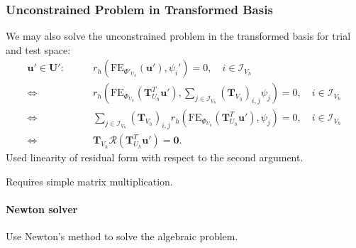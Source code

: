 \begin{frame}
\frametitle<presentation>{Unconstrained Problem in Transformed Basis}
We may also solve the unconstrained problem 
in the transformed basis for trial and test space:
\begin{equation}\label{Eq:TransformedUnconstrainedProblem}
\begin{split}
\mathbf{u}'\in\mathbf{U}' : \qquad 
& r_h\left(\text{FE}_{\Phi'_{U_h}}(\mathbf{u}'),\psi_i'\right) = 0, \quad
i\in\mathcal{I}_{V_h}\\
\Leftrightarrow \  &
r_h\left(\text{FE}_{\Phi_{U_h}}(\mathbf{T}^T_{U_h}\mathbf{u}'),
\sum_{j\in\mathcal{I}_{V_h}}\left(\mathbf{T}_{V_h}\right)_{i,j}\psi_j\right) = 0, \quad
i\in\mathcal{I}_{V_h}\\
\Leftrightarrow \  &
\sum_{j\in\mathcal{I}_{V_h}} \left(\mathbf{T}_{V_h}\right)_{i,j} 
r_h\left(\text{FE}_{\Phi_{U_h}}(\mathbf{T}^T_{U_h}\mathbf{u}'),
\psi_j\right) = 0, \quad
i\in\mathcal{I}_{V_h}\\
\Leftrightarrow \  &
\mathbf{T}_{V_h} \mathcal{R}\left(\mathbf{T}^T_{U_h}\mathbf{u}'\right)
= \mathbf{0} .
\end{split}
\end{equation}
Used linearity of residual form with respect to the second argument.

Requires simple matrix multiplication.
\end{frame}

\paragraph{Newton solver}

Use Newton's method to solve the algebraic problem.

